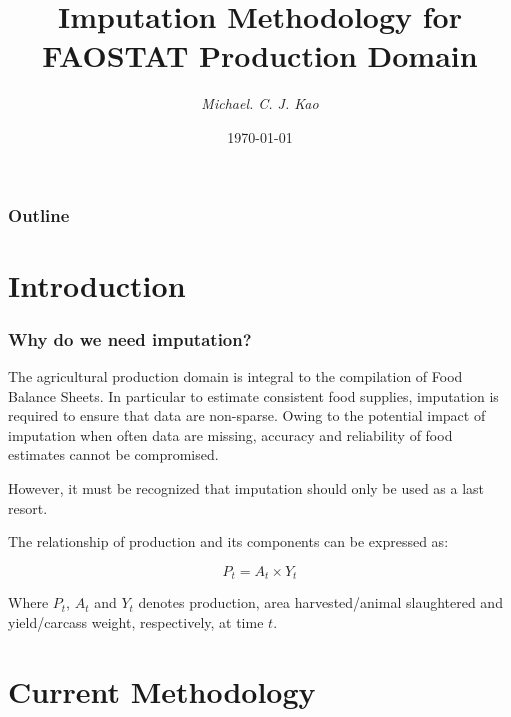 \documentclass{beamer}
\title{Imputation Methodology for FAOSTAT Production Domain}
\author{\it Michael. C. J.  Kao}
\institute{Food and Agriculture Organization \\of the United Nation}
\date{\today}
\begin{document}
\frame{
  \titlepage
}

\begin{frame}
  \frametitle{Outline}
  \tableofcontents
\end{frame}

\section{Introduction}



\begin{frame}
  \frametitle{Why do we need imputation?}

  The agricultural production domain is integral to the compilation of
  Food Balance Sheets. In particular to estimate consistent food
  supplies, imputation is required to ensure that data are non-sparse.
  Owing to the potential impact of imputation when often data are
  missing, accuracy and reliability of food estimates cannot be
  compromised.

  \vspace{0.5cm}

  However, it must be recognized that imputation should only be used
  as a last resort.

\end{frame}

\begin{frame}  
  \vspace{0.5cm}
  The relationship of production and its components can be expressed as:

  \begin{equation}
    P_t = A_t \times Y_t
  \end{equation}
  
  Where $P_t$, $A_t$ and $Y_t$ denotes production, area
  harvested/animal slaughtered and yield/carcass weight, respectively,
  at time $t$.

\end{frame}  


\section{Current Methodology}
\end{document}
